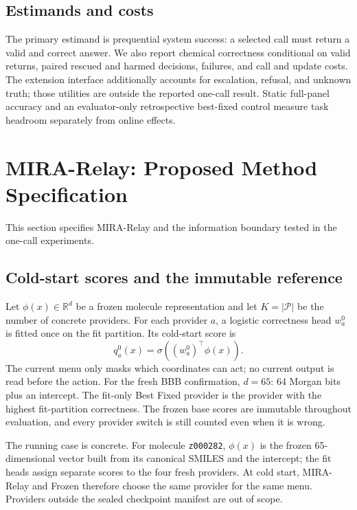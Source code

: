 \documentclass[sigconf,anonymous]{aamas}
\begin{document}
\subsection{Estimands and costs}
The primary estimand is prequential system success: a selected call must return a valid and correct answer. We also report chemical correctness conditional on valid returns, paired rescued and harmed decisions, failures, and call and update costs. The extension interface additionally accounts for escalation, refusal, and unknown truth; those utilities are outside the reported one-call result. Static full-panel accuracy and an evaluator-only retrospective best-fixed control measure task headroom separately from online effects.

\section{MIRA-Relay: Proposed Method Specification}
This section specifies MIRA-Relay and the information boundary tested in the one-call experiments.

\subsection{Cold-start scores and the immutable reference}
Let $\phi(x)\in\mathbb{R}^{d}$ be a frozen molecule representation and let $K=|\mathcal P|$ be the number of concrete providers. For each provider $a$, a logistic correctness head $w_a^0$ is fitted once on the fit partition. Its cold-start score is
$$
q_a^0(x)=\sigma\!\left((w_a^0)^\top\phi(x)\right).
$$
The current menu only masks which coordinates can act; no current output is read before the action. For the fresh BBB confirmation, $d=65$: 64 Morgan bits plus an intercept. The fit-only Best Fixed provider is the provider with the highest fit-partition correctness. The frozen base scores are immutable throughout evaluation, and every provider switch is still counted even when it is wrong.

The running case is concrete. For molecule \texttt{z000282}, $\phi(x)$ is the frozen 65-dimensional vector built from its canonical SMILES and the intercept; the fit heads assign separate scores to the four fresh providers. At cold start, MIRA-Relay and Frozen therefore choose the same provider for the same menu. Providers outside the sealed checkpoint manifest are out of scope.
\end{document}
